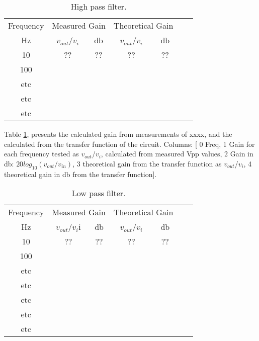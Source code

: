 \documentclass[journal]{IEEEtran}
\begin{document}
\begin{table}[!ht] %
\centering
\caption{High pass filter.}
\begin{tabular}{ccccccc}
Frequency & \multicolumn{2}{l}{Measured Gain} & \multicolumn{2}{l}{Theoretical Gain} \\
Hz   & $v_{out}$/$v_i$    & db     & $v_{out}$/$v_i$  & db           \\ \hline
10   & ??  &  ??           & ??   & ??       \\
100       &                                   &              &                                 &                              \\
etc &  &   &           &      \\                       
etc &  &   &           &      \\  
etc &  &   &           &      

\end{tabular}
\label{table:Exps1}
\end{table}

Table \ref{table:Exps1}, presents the calculated gain from measurements of xxxx, and the calculated from the transfer function of the circuit. Columns: [ 0 Freq, 1 Gain for each frequency tested as $v_{out}$/$v_i$, calculated from measured Vpp values,  2 Gain in db: $20log_{10}(v_{out}/v_{in})$, 3 theoretical gain from the transfer function as $v_{out}$/$v_i$, 4 theoretical gain in db from the transfer function].


\begin{table}[!ht] %
\centering
\caption{Low pass filter.}
\begin{tabular}{ccccccc}
Frequency & \multicolumn{2}{l}{Measured Gain} & \multicolumn{2}{l}{Theoretical Gain} \\
Hz   & $v_{out}$/$v_i$i     & db     & $v_{out}$/$v_i$   & db           \\ \hline
10   & ??  &  ??           & ??   & ??       \\
100       &                                   &              &                                 &                              \\
etc &  &   &           &      \\                       
etc &  &   &           &      \\  
etc &  &   &           &      \\                       
etc &  &   &           &      \\  
etc &  &   &           &      
   
\end{tabular}
\label{table:Exps2}
\end{table}
\end{document}
